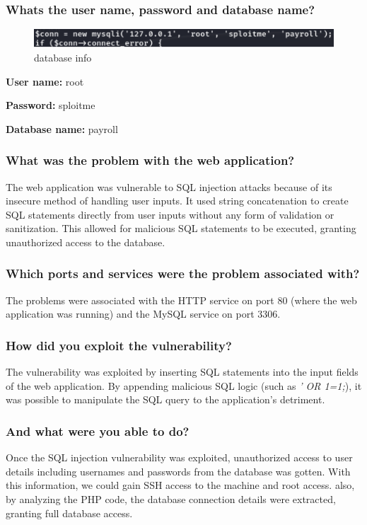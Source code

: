 \subsubsection{Whats the user name, password and database name?}

\begin{figure}[H]
      \centering
      \includegraphics[width=0.8\linewidth]{pic/database info.png}
      \caption{database info}
      \label{fig:database info}
\end{figure}

\textbf{User name:} root

\textbf{Password:} sploitme

\textbf{Database name:} payroll


\subsubsection{What was the problem with the web application?}
The web application was vulnerable to SQL injection attacks because of its insecure method
of handling user inputs. It used string concatenation to create SQL statements directly from
user inputs without any form of validation or sanitization. This allowed for malicious SQL
statements to be executed, granting unauthorized access to the database.


\subsubsection{Which ports and services were the problem associated with?}
The problems were associated with the HTTP service on port 80 (where the web application
was running) and the MySQL service on port 3306.


\subsubsection{How did you exploit the vulnerability?}
The vulnerability was exploited by inserting SQL statements into the input fields of the web
application. By appending malicious SQL logic (such as \textit{' OR 1=1;}), it was possible to
manipulate the SQL query to the application's detriment.


\subsubsection{And what were you able to do?}
Once the SQL injection vulnerability was exploited, unauthorized access to user details
including usernames and passwords from the database was gotten. With this information,
we could gain SSH access to the machine and root access. also, by analyzing the
PHP code, the database connection details were extracted, granting full database access.

